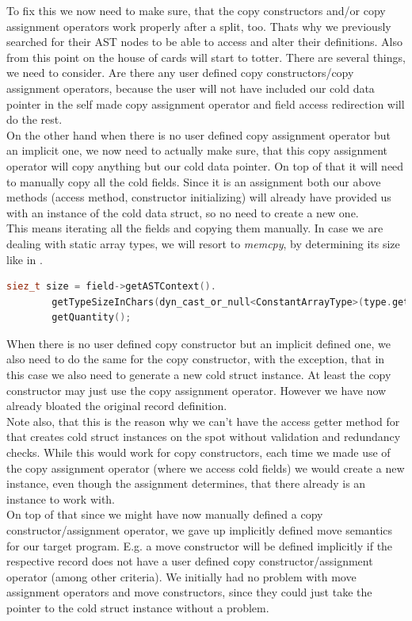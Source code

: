 To fix this we now need to make sure, that the copy constructors and/or copy assignment operators work properly after a split, too. Thats why we previously searched for their AST nodes to be able to access and alter their definitions. Also from this point on the house of cards will start to totter. There are several things, we need to consider. Are there any user defined copy constructors/copy assignment operators, because the user will not have included our cold data pointer in the self made copy assignment operator and field access redirection will do the rest.\\
On the other hand when there is no user defined copy assignment operator but an implicit one, we now need to actually make sure, that this copy assignment operator will copy anything but our cold data pointer. On top of that it will need to manually copy all the cold fields. Since it is an assignment both our above methods (access method, constructor initializing) will already have provided us with an instance of the cold data struct, so no need to create a new one.\\
This means iterating all the fields and copying them manually. In case we are dealing with static array types, we will resort to \textit{memcpy}, by determining its size like in .
\begin{lstlisting}[language=C++, name={Retrieving the size of a static array type through its AST node.}, label={memcpy_quant}]
	siez_t size = field->getASTContext().
		getTypeSizeInChars(dyn_cast_or_null<ConstantArrayType>(type.getTypePtr())).
		getQuantity();
\end{lstlisting}
When there is no user defined copy constructor but an implicit defined one, we also need to do the same for the copy constructor, with the exception, that in this case we also need to generate a new cold struct instance. At least the copy constructor may just use the copy assignment operator. However we have now already bloated the original record definition.\\
Note also, that this is the reason why we can't have the access getter method for that creates cold struct instances on the spot without validation and redundancy checks. While this would work for copy constructors, each time we made use of the copy assignment operator (where we access cold fields) we would create a new instance, even though the assignment determines, that there already is an instance to work with.\\
On top of that since we might have now manually defined a copy constructor/assignment operator, we gave up implicitly defined move semantics for our target program. E.g. a move constructor will be defined implicitly if the respective record does not have a user defined copy constructor/assignment operator  (among other criteria). We initially had no problem with move assignment operators and move constructors, since they could just take the pointer to the cold struct instance without a problem.\\
